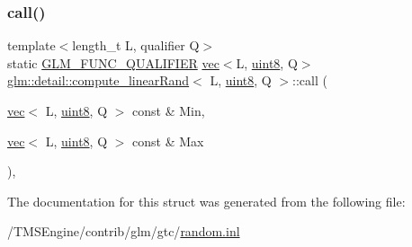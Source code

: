 \subsubsection{\texorpdfstring{call()}{call()}}
{\footnotesize\ttfamily template$<$length\+\_\+t L, qualifier Q$>$ \\
static \hyperlink{setup_8hpp_a33fdea6f91c5f834105f7415e2a64407}{G\+L\+M\+\_\+\+F\+U\+N\+C\+\_\+\+Q\+U\+A\+L\+I\+F\+I\+ER} \hyperlink{structglm_1_1vec}{vec}$<$L, \hyperlink{namespaceglm_1_1detail_aef2588f97d090cc19fbbe0c74fe17c8f}{uint8}, Q$>$ \hyperlink{structglm_1_1detail_1_1compute__linear_rand}{glm\+::detail\+::compute\+\_\+linear\+Rand}$<$ L, \hyperlink{namespaceglm_1_1detail_aef2588f97d090cc19fbbe0c74fe17c8f}{uint8}, Q $>$\+::call (\begin{DoxyParamCaption}\item[{\hyperlink{structglm_1_1vec}{vec}$<$ L, \hyperlink{namespaceglm_1_1detail_aef2588f97d090cc19fbbe0c74fe17c8f}{uint8}, Q $>$ const \&}]{Min,  }\item[{\hyperlink{structglm_1_1vec}{vec}$<$ L, \hyperlink{namespaceglm_1_1detail_aef2588f97d090cc19fbbe0c74fe17c8f}{uint8}, Q $>$ const \&}]{Max }\end{DoxyParamCaption})\hspace{0.3cm}{\ttfamily [inline]}, {\ttfamily [static]}}



The documentation for this struct was generated from the following file\+:\begin{DoxyCompactItemize}
\item 
/\+T\+M\+S\+Engine/contrib/glm/gtc/\hyperlink{random_8inl}{random.\+inl}\end{DoxyCompactItemize}
